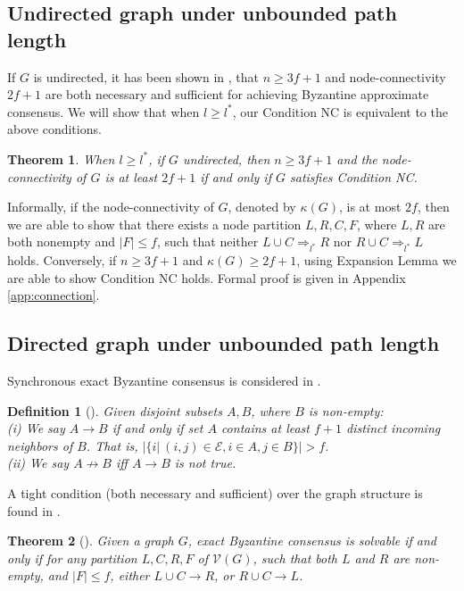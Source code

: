 \documentclass[letterpaper, 11pt]{article}
\newtheorem{definition}{Definition}[section]
\newtheorem{theorem}{Theorem}[section]
\newcommand{\calE}{{\mathcal{E}}}
\newcommand{\calV}{{\mathcal{V}}}
\begin{document}
\subsection{Undirected graph under unbounded path length}
\label{sec: extension}
If $G$ is undirected, it has been shown in \cite{impossible_proof_lynch}, that $n\ge 3f+1$ and node-connectivity $2f+1$ are both necessary and sufficient for achieving Byzantine approximate consensus. We will show that when $l\ge l^*$, our Condition NC is equivalent to the above conditions.

\begin{theorem}
\label{equiUndirected}
  When $l\ge l^*$, if $G$ undirected, then $n\ge 3f+1$ and the   node-connectivity of $G$ is at least $2f+1$ if and only if $G$ satisfies Condition NC.
\end{theorem}
Informally, if the node-connectivity of $G$, denoted by $\kappa(G)$, is at most $2f$, then we are able to show that there exists a node partition $L, R, C, F$, where $L, R$ are both nonempty and $|F|\le f$, such that neither $L\cup C\Rightarrow_{l^*} R$ nor $R\cup C\Rightarrow_{l^*} L$ holds. Conversely, if $n\ge 3f+1$ and $\kappa(G)\ge 2f+1$, using Expansion Lemma we are able to show Condition NC holds. Formal proof is given in Appendix \ref{app:connection}. 

\subsection{Directed graph under unbounded path length}

Synchronous exact Byzantine consensus is considered in \cite{Tseng2014}.  
\begin{definition}[\cite{Tseng2014}]
Given disjoint subsets $A, B$, where $B$ is non-empty: \\
(i) We say $A\to B$ if and only if set $A$ contains at least $f+1$ distinct incoming neighbors of $B$. That is, $\left | \{i | ~(i,j)\in \calE, i\in A, j\in B\} \right |>f$.\\
(ii) We say $A\not\to B$ iff $A\to B$ is not true.
\end{definition}
A tight condition (both necessary and sufficient) over the graph structure is found in \cite{Tseng2014}.

\begin{theorem}[\cite{Tseng2014}]
Given a graph $G$, exact Byzantine consensus is solvable if and only if for any partition $L, C, R, F$ of $\calV(G)$, such that both $L$ and $R$ are non-empty, and $|F|\le f$, either $L\cup C\to R$, or $R\cup C\to L$.
\end{theorem}
\end{document}
